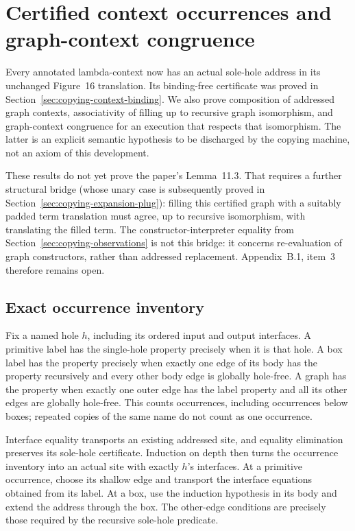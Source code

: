 \clearpage
\section{Certified context occurrences and graph-context congruence}
\label{sec:copying-certified-contexts}
Every annotated lambda-context now has an actual sole-hole address in its
unchanged Figure~16 translation. Its binding-free certificate was proved in
Section~\ref{sec:copying-context-binding}. We also prove composition of
addressed graph contexts, associativity of filling up to recursive graph
isomorphism, and graph-context congruence for an execution that respects that
isomorphism. The latter is an explicit semantic hypothesis to be discharged
by the copying machine, not an axiom of this development.

These results do not yet prove the paper's Lemma~11.3. That requires a further
structural bridge (whose unary case is subsequently proved in
Section~\ref{sec:copying-expansion-plug}): filling this certified graph with a suitably padded term
translation must agree, up to recursive isomorphism, with translating the
filled term. The constructor-interpreter equality from
Section~\ref{sec:copying-observations} is not this bridge: it concerns
re-evaluation of graph constructors, rather than addressed replacement.
Appendix~B.1, item~3 therefore remains open.

\subsection{Exact occurrence inventory}


Fix a named hole $h$, including its ordered input and output interfaces.
A primitive label has the single-hole property precisely when it is that
hole. A box label has the property precisely when exactly one edge of its
body has the property recursively and every other body edge is globally
hole-free. A graph has the property when exactly one outer edge has the
label property and all its other edges are globally hole-free. This counts
occurrences, including occurrences below boxes; repeated copies of the same
name do not count as one occurrence.





Interface equality transports an existing addressed site, and equality
elimination preserves its sole-hole certificate. Induction on depth then
turns the occurrence inventory into an actual site with exactly $h$'s
interfaces. At a primitive occurrence, choose its shallow edge and transport
the interface equations obtained from its label. At a box, use the induction
hypothesis in its body and extend the address through the box. The other-edge
conditions are precisely those required by the recursive sole-hole predicate.

